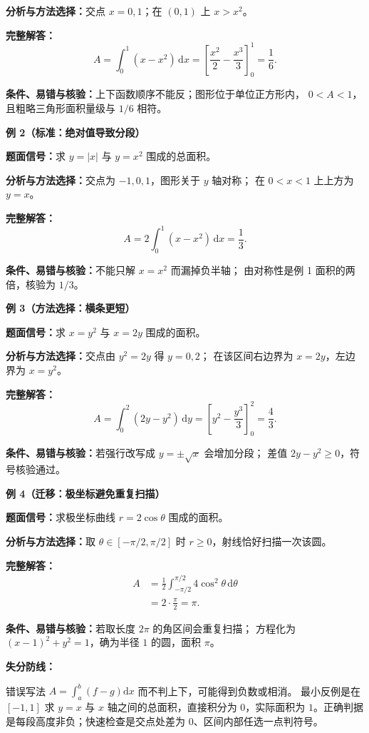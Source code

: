 \begin{knowledgeBox}
\textbf{分析与方法选择：}交点 \(x=0,1\)；在 \((0,1)\) 上
\(x>x^2\)。

\textbf{完整解答：}
\[
A=\int_0^1(x-x^2)\,\mathrm dx
=\left[\frac{x^2}{2}-\frac{x^3}{3}\right]_0^1
=\frac16.
\]

\textbf{条件、易错与核验：}上下函数顺序不能反；图形位于单位正方形内，
\(0<A<1\)，且粗略三角形面积量级与 \(1/6\) 相符。

\textbf{例 2（标准：绝对值导致分段）}

\textbf{题面信号：}求 \(y=|x|\) 与 \(y=x^2\) 围成的总面积。

\textbf{分析与方法选择：}交点为 \(-1,0,1\)，图形关于 \(y\) 轴对称；
在 \(0<x<1\) 上上方为 \(y=x\)。

\textbf{完整解答：}
\[
A=2\int_0^1(x-x^2)\,\mathrm dx=\frac13.
\]

\textbf{条件、易错与核验：}不能只解 \(x=x^2\) 而漏掉负半轴；
由对称性是例 1 面积的两倍，核验为 \(1/3\)。

\textbf{例 3（方法选择：横条更短）}

\textbf{题面信号：}求 \(x=y^2\) 与 \(x=2y\) 围成的面积。

\textbf{分析与方法选择：}交点由 \(y^2=2y\) 得 \(y=0,2\)；
在该区间右边界为 \(x=2y\)，左边界为 \(x=y^2\)。

\textbf{完整解答：}
\[
A=\int_0^2(2y-y^2)\,\mathrm dy
=\left[y^2-\frac{y^3}{3}\right]_0^2
=\frac43.
\]

\textbf{条件、易错与核验：}若强行改写成 \(y=\pm\sqrt x\) 会增加分段；
差值 \(2y-y^2\ge0\)，符号核验通过。

\textbf{例 4（迁移：极坐标避免重复扫描）}

\textbf{题面信号：}求极坐标曲线 \(r=2\cos\theta\) 围成的面积。

\textbf{分析与方法选择：}取
\(\theta\in[-\pi/2,\pi/2]\) 时 \(r\ge0\)，射线恰好扫描一次该圆。

\textbf{完整解答：}
\[
\begin{aligned}
A&=\frac12\int_{-\pi/2}^{\pi/2}4\cos^2\theta\,\mathrm d\theta\\
&=2\cdot\frac\pi2=\pi.
\end{aligned}
\]

\textbf{条件、易错与核验：}若取长度 \(2\pi\) 的角区间会重复扫描；
方程化为 \((x-1)^2+y^2=1\)，确为半径 \(1\) 的圆，面积 \(\pi\)。

\textbf{失分防线：}

错误写法 \(A=\int_a^b(f-g)\mathrm dx\) 而不判上下，可能得到负数或相消。
最小反例是在 \([-1,1]\) 求 \(y=x\) 与 \(x\) 轴之间的总面积，直接积分为
\(0\)，实际面积为 \(1\)。正确判据是每段高度非负；快速检查是交点处差为
\(0\)、区间内部任选一点判符号。


\end{knowledgeBox}
